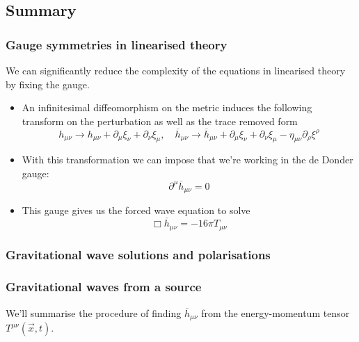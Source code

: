 \subsection{Summary}

\subsubsection{Gauge symmetries in linearised theory} 

We can significantly reduce the 
complexity of the equations in linearised theory 
by fixing the gauge. 
\begin{itemize}
	\item An infinitesimal diffeomorphism on the metric induces the following transform on the perturbation as well as the trace removed form
		\[
		 h_{ \mu \nu } \to h_{ \mu \nu } + \partial  _ \mu \xi _ \nu 
		 + \partial  _ \nu \xi _ \mu, \quad 
		 \overline{ h } _{ \mu \nu }  \to \overline{ h} _{ \mu \nu } 
		 + \partial  _ \mu \xi _ \nu + \partial  _ \nu \xi _ \mu 
		  - \eta _{ \mu \nu } \partial  _ \rho \xi ^ \rho 
		\]
	\item With this transformation we can impose 
		that we're working in the de Donder gauge: 
		\[
		 \partial  ^ \mu \overline{ h } _{ \mu \nu }  =  0 
		\] 
	\item This gauge gives us the forced 
		wave equation to solve 
		\[
		 \Box \overline{ h } _{ \mu \nu }  =  - 16 \pi T_{ \mu \nu }
		\] 
\end{itemize}

\subsubsection{Gravitational wave solutions and polarisations}

\subsubsection{Gravitational waves from a source}
We'll summarise the procedure of finding $ \overline{ h }_{ \mu \nu }$ 
from the energy-momentum tensor $ T^{ \mu \nu } \left( \vec{x}, t  \right)$. 

